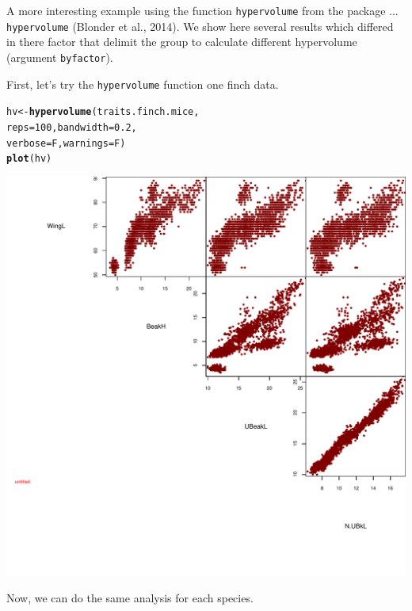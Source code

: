 \documentclass[12pt]{article}\usepackage[]{graphicx}\usepackage[]{color}
\makeatletter
\def\maxwidth{ %
  \ifdim\Gin@nat@width>\linewidth
    \linewidth
  \else
    \Gin@nat@width
  \fi
}
\newcommand{\hlnum}[1]{\textcolor[rgb]{0.686,0.059,0.569}{#1}}%
\newcommand{\hlstd}[1]{\textcolor[rgb]{0.345,0.345,0.345}{#1}}%
\newcommand{\hlkwb}[1]{\textcolor[rgb]{0.69,0.353,0.396}{#1}}%
\newcommand{\hlkwc}[1]{\textcolor[rgb]{0.333,0.667,0.333}{#1}}%
\newcommand{\hlkwd}[1]{\textcolor[rgb]{0.737,0.353,0.396}{\textbf{#1}}}%
\newenvironment{kframe}{%
 \def\at@end@of@kframe{}%
 \ifinner\ifhmode%
  \def\at@end@of@kframe{\end{minipage}}%
  \begin{minipage}{\columnwidth}%
 \fi\fi%
 \def\FrameCommand##1{\hskip\@totalleftmargin \hskip-\fboxsep
 \colorbox{shadecolor}{##1}\hskip-\fboxsep
     \hskip-\linewidth \hskip-\@totalleftmargin \hskip\columnwidth}%
 \MakeFramed {\advance\hsize-\width
   \@totalleftmargin\z@ \linewidth\hsize
   \@setminipage}}%
 {\par\unskip\endMakeFramed%
 \at@end@of@kframe}
\newenvironment{knitrout}{}{} %
\makeatother
\begin{document}
\newpage
A more interesting example using the function \texttt{hypervolume} from the package ... \texttt{hypervolume} (Blonder et al., 2014). We show here several results which differed in there factor that delimit the group to calculate different hypervolume (argument \texttt{byfactor}). 

First, let's try the \texttt{hypervolume} function one finch data.
\begin{knitrout}
\color{fgcolor}\begin{kframe}
\begin{alltt}
\hlstd{hv}\hlkwb{<-}\hlkwd{hypervolume}\hlstd{(traits.finch.mice,}
        \hlkwc{reps} \hlstd{=} \hlnum{100}\hlstd{,}\hlkwc{bandwidth} \hlstd{=} \hlnum{0.2}\hlstd{,}
        \hlkwc{verbose} \hlstd{= F,} \hlkwc{warnings} \hlstd{= F)}
\hlkwd{plot}\hlstd{(hv)}
\end{alltt}
\end{kframe}
\includegraphics[width=\maxwidth]{figure/unnamed-chunk-54} 

\end{knitrout}

Now, we can do the same analysis for each species.
\end{document}
